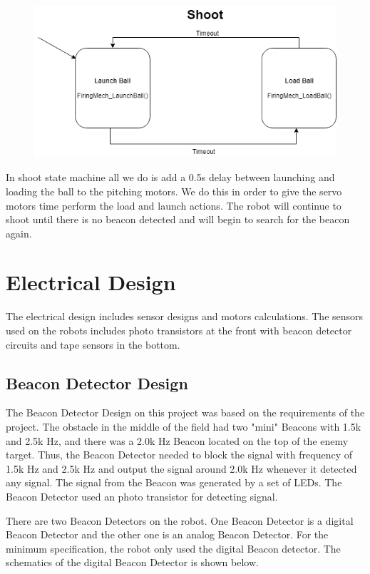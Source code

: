 \documentclass{article}
\begin{document}
\begin{figure}[H]
    \centering
    \includegraphics[scale = 0.5]{Shoot.png}
\end{figure}

In shoot state machine all we do is add a 0.5s delay between launching and loading the ball to the pitching motors.  We do this in order to give the servo motors time perform the load and launch actions.  The robot will continue to shoot until there is no beacon detected and will begin to search for the beacon again.

\section{Electrical Design}
\doublespacing

The electrical design includes sensor designs and motors calculations. The sensors used on the robots includes photo transistors at the front with beacon detector circuits and tape sensors in the bottom. 
\subsection{Beacon Detector Design}
The Beacon Detector Design on this project was based on the requirements of the project. The obstacle in the middle of the field had two "mini" Beacons with 1.5k and 2.5k Hz, and there was a 2.0k Hz Beacon located on the top of the enemy target. Thus, the Beacon Detector needed to block the signal with frequency of 1.5k Hz and 2.5k Hz and output the signal around 2.0k Hz whenever it detected any signal. The signal from the Beacon was generated by a set of LEDs. The Beacon Detector used an photo transistor for detecting signal. 

There are two Beacon Detectors on the robot. One Beacon Detector is a digital Beacon Detector and the other one is an analog Beacon Detector. For the minimum specification, the robot only used the digital Beacon detector. The schematics of the digital Beacon Detector is shown below.
\end{document}
